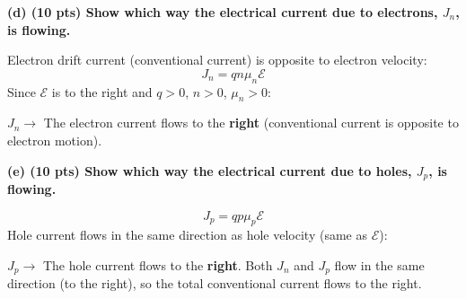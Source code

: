 \documentclass[11pt]{article}
\begin{document}
\textbf{(d) (10 pts) Show which way the electrical current due to electrons, $J_n$, is flowing.}

Electron drift current (conventional current) is opposite to electron velocity:
\[
  J_n = qn\mu_n\mathcal{E}
\]
Since $\mathcal{E}$ is to the right and $q > 0$, $n > 0$, $\mu_n > 0$:

\begin{answerbox}
  $J_n \rightarrow$ The electron current flows to the \textbf{right} (conventional current is opposite to electron motion).
\end{answerbox}

\textbf{(e) (10 pts) Show which way the electrical current due to holes, $J_p$, is flowing.}

\[
  J_p = qp\mu_p\mathcal{E}
\]
Hole current flows in the same direction as hole velocity (same as $\mathcal{E}$):

\begin{answerbox}
  $J_p \rightarrow$ The hole current flows to the \textbf{right}. Both $J_n$ and $J_p$ flow in the same direction (to the right), so the total conventional current flows to the right.
\end{answerbox}
\end{document}
